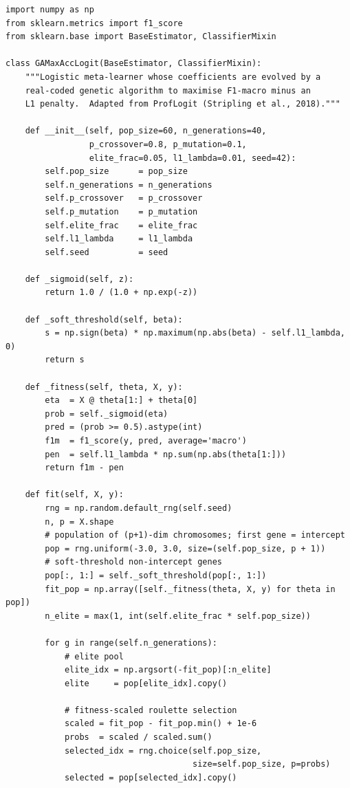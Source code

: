 \begin{lstlisting}
import numpy as np
from sklearn.metrics import f1_score
from sklearn.base import BaseEstimator, ClassifierMixin

class GAMaxAccLogit(BaseEstimator, ClassifierMixin):
    """Logistic meta-learner whose coefficients are evolved by a
    real-coded genetic algorithm to maximise F1-macro minus an
    L1 penalty.  Adapted from ProfLogit (Stripling et al., 2018)."""

    def __init__(self, pop_size=60, n_generations=40,
                 p_crossover=0.8, p_mutation=0.1,
                 elite_frac=0.05, l1_lambda=0.01, seed=42):
        self.pop_size      = pop_size
        self.n_generations = n_generations
        self.p_crossover   = p_crossover
        self.p_mutation    = p_mutation
        self.elite_frac    = elite_frac
        self.l1_lambda     = l1_lambda
        self.seed          = seed

    def _sigmoid(self, z):
        return 1.0 / (1.0 + np.exp(-z))

    def _soft_threshold(self, beta):
        s = np.sign(beta) * np.maximum(np.abs(beta) - self.l1_lambda, 0)
        return s

    def _fitness(self, theta, X, y):
        eta  = X @ theta[1:] + theta[0]
        prob = self._sigmoid(eta)
        pred = (prob >= 0.5).astype(int)
        f1m  = f1_score(y, pred, average='macro')
        pen  = self.l1_lambda * np.sum(np.abs(theta[1:]))
        return f1m - pen

    def fit(self, X, y):
        rng = np.random.default_rng(self.seed)
        n, p = X.shape
        # population of (p+1)-dim chromosomes; first gene = intercept
        pop = rng.uniform(-3.0, 3.0, size=(self.pop_size, p + 1))
        # soft-threshold non-intercept genes
        pop[:, 1:] = self._soft_threshold(pop[:, 1:])
        fit_pop = np.array([self._fitness(theta, X, y) for theta in pop])
        n_elite = max(1, int(self.elite_frac * self.pop_size))

        for g in range(self.n_generations):
            # elite pool
            elite_idx = np.argsort(-fit_pop)[:n_elite]
            elite     = pop[elite_idx].copy()

            # fitness-scaled roulette selection
            scaled = fit_pop - fit_pop.min() + 1e-6
            probs  = scaled / scaled.sum()
            selected_idx = rng.choice(self.pop_size,
                                      size=self.pop_size, p=probs)
            selected = pop[selected_idx].copy()


\end{lstlisting}
